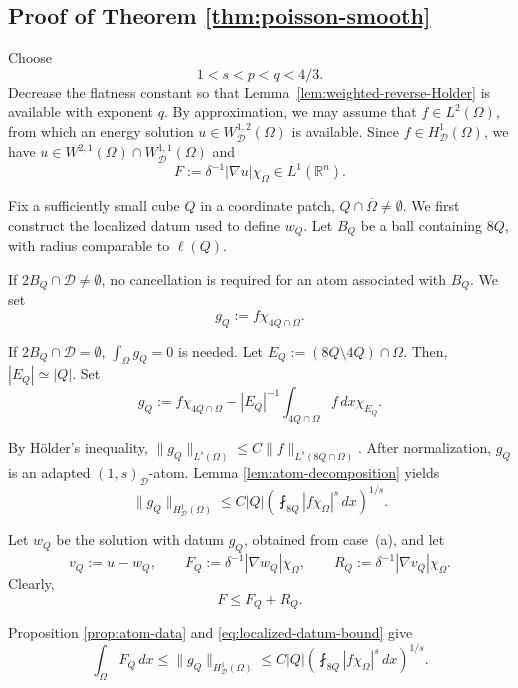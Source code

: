 \documentclass[12pt]{amsart}
\numberwithin{equation}{section}
\newcommand{\bR}{\mathbb{R}}
\newcommand\cD{\mathcal{D}}
\begin{document}
\subsection{Proof of Theorem \ref{thm:poisson-smooth}}

Choose
\begin{equation}
       1<s<p<q< 4/3.
       \label{eq:interpolation-exponents}
\end{equation}
Decrease the flatness constant so that Lemma~\ref{lem:weighted-reverse-Holder} is available with exponent $q$. 
By approximation, we may assume that $f\in L^2(\Omega)$, from which an energy solution $u \in W^{1,2}_\cD(\Omega)$ is available. 
Since $f\in H^1_\cD(\Omega)$, we have $u \in W^{2,1}(\Omega) \cap W^{1,1}_\cD(\Omega)$ and
\[
 F:=\delta^{-1}|\nabla u|\chi_\Omega
 \in L^1(\bR^n).
\]

Fix a sufficiently small cube $Q$ in a coordinate patch, $Q\cap \overline \Omega \neq \emptyset$. We first construct the localized datum used to define $w_Q$. 
Let $B_Q$ be a ball containing $8Q$, with radius comparable to $\ell (Q)$.

If $2B_Q\cap\cD\neq\emptyset$, no cancellation is required for an atom associated with $B_Q$. We set
\[
 g_Q:=f\chi_{4Q\cap\Omega}.
\]

If $2B_Q\cap\cD=\emptyset$, $\int_\Omega g_Q=0$ is needed. Let
$E_Q := (8Q\setminus 4Q)\cap\Omega$. Then, $|E_Q|\simeq|Q|$. Set
\[
 g_Q:=f\chi_{4Q\cap\Omega}
 -|E_Q|^{-1} \int_{4Q\cap\Omega}f\,dx
  \chi_{E_Q}.
\]

By H\"older's inequality, $\|g_Q\|_{L^s(\Omega)} \leq C\|f\|_{L^s(8Q\cap\Omega)}$.
After normalization, $g_Q$ is an adapted $(1,s)_\cD$-atom. Lemma
\ref{lem:atom-decomposition} yields
\begin{equation}
 \|g_Q\|_{H^1_\cD(\Omega)}
 \leq C|Q|
 \left(\fint_{8Q}|f\chi_\Omega|^s\,dx\right)^{1/s}.
 \label{eq:localized-datum-bound}
\end{equation}

Let $w_Q$ be the solution with datum $g_Q$, obtained from case~(a), and let
\[
 v_Q:=u-w_Q,
 \qquad
 F_Q:= \delta^{-1}|\nabla w_Q|\chi_\Omega,
 \qquad
 R_Q:=\delta^{-1}|\nabla v_Q|\chi_\Omega.
\]
Clearly, 
\begin{equation}
       F\leq F_Q+R_Q.
       \label{eq:weighted-decomposition}
\end{equation}

Proposition \ref{prop:atom-data} and \eqref{eq:localized-datum-bound} give
\begin{equation}
\int_\Omega F_Q\,dx
 \leq \|g_Q\|_{H_{\cD}^1(\Omega)}
 \leq C|Q| \left(\fint_{8Q}|f\chi_\Omega|^s\,dx\right)^{1/s}.
 \label{eq:interpolation-low}
\end{equation}
\end{document}

